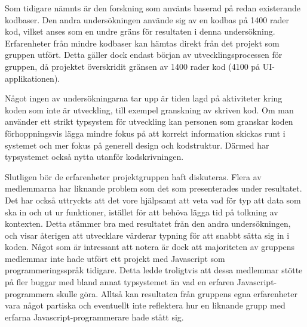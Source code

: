 Som tidigare nämnts är den forskning som använts baserad på redan existerande kodbaser. Den andra undersökningen använde sig av en kodbas på 1400 rader kod, vilket anses som en undre gräns för resultaten i denna undersökning. Erfarenheter från mindre kodbaser kan hämtas direkt från det projekt som gruppen utfört. Detta gäller dock endast början av utvecklingsprocessen för gruppen, då projektet överskridit gränsen av 1400 rader kod (4100 på UI-applikationen\cite{current-ui-commit}).

Något ingen av undersökningarna tar upp är tiden lagd på aktiviteter kring koden som inte är utveckling, till exempel granskning av skriven kod. Om man använder ett strikt typsystem för utveckling kan personen som granskar koden förhoppningsvis lägga mindre fokus på att korrekt information skickas runt i systemet och mer fokus på generell design och kodstruktur. Därmed har typsystemet också nytta utanför kodskrivningen.

Slutligen bör de erfarenheter projektgruppen haft diskuteras. Flera av medlemmarna har liknande problem som det som presenterades under resultatet. Det har också uttryckts att det vore hjälpsamt att veta vad för typ att data som ska in och ut ur funktioner, istället för att behöva lägga tid på tolkning av kontexten. Detta stämmer bra med resultatet från den andra undersökningen, och visar återigen att utvecklare värderar typning för att snabbt sätta sig in i koden. Något som är intressant att notera är dock att majoriteten av gruppens medlemmar inte hade utfört ett projekt med Javascript som programmeringsspråk tidigare. Detta ledde troligtvis att dessa medlemmar stötte på fler buggar med bland annat typsystemet än vad en erfaren Javascript-programmera skulle göra. Alltså kan resultaten från gruppens egna erfarenheter vara något partiska och eventuellt inte reflektera hur en liknande grupp med erfarna Javascript-programmerare hade stått sig. 

\pagebreak